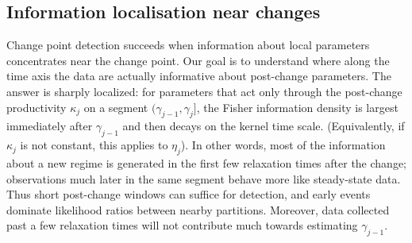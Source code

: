 \documentclass{article}
\theoremstyle{plain}
\theoremstyle{definition}
\newcommand{\1}{\mathbf{1}}
\begin{document}
    
    \subsection{Information localisation near changes}
    \label{sec:info}
    
    Change point detection succeeds when information about local parameters concentrates near the change point. Our goal is to understand where along the time axis the data are actually informative about post-change parameters. The answer is sharply localized: for parameters that act only through the post-change productivity $\kappa_j$ on a segment $(\gamma_{j-1},\gamma_j]$, the Fisher information density is largest immediately after $\gamma_{j-1}$ and then decays on the kernel time scale. (Equivalently, if $\kappa_j$ is not constant, this applies to $\eta_j$). In other words, most of the information about a new regime is generated in the first few relaxation times after the change; observations much later in the same segment behave more like steady-state data. %
    Thus short post-change windows can suffice for detection, and early events dominate likelihood ratios between nearby partitions. Moreover, data collected past a few relaxation times will not contribute much towards estimating $\gamma_{j-1}$.
    
\end{document}

